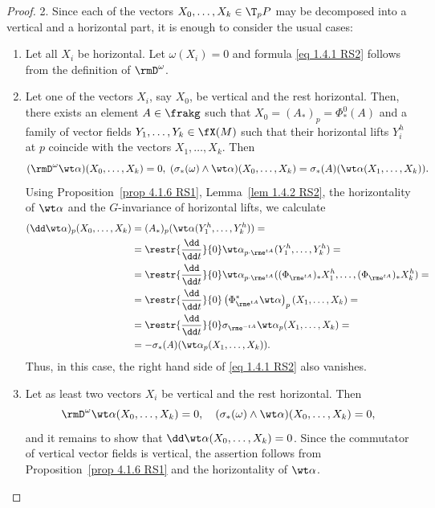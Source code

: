 \begin{proof}
    2. Since each of the vectors $X_0,\ldots,X_k\in \T_pP$ may be decomposed into a vertical and a horizontal part, it is enough to consider the usual cases:
    \begin{enumerate}[label=(\alph*)]
        \item Let all $X_i$ be horizontal. Let $\omega(X_i)=0$ and formula \eqref{eq 1.4.1 RS2} follows from the definition of $\rmD^\omega$.
        \item Let one of the vectors $X_i$, say $X_0$, be vertical and the rest horizontal. Then, there exists an element $A\in\frakg$ such that $X_0=(A_\ast)_p=\Phi^0_\ast(A)$ and a family of vector fields $Y_1,\ldots,Y_k\in\fX(M)$ such that their horizontal lifts $Y_i^h$ at $p$ coincide with the vectors $X_1,\ldots,X_k$. Then
        \[(\rmD^\omega\wt\alpha)(X_0,\ldots,X_k)=0,\; (\sigma_\ast(\omega)\wedge\wt\alpha)(X_0,\ldots,X_k)=\sigma_\ast(A)(\wt\alpha(X_1,\ldots,X_k)).\]
        Using Proposition~\ref{prop 4.1.6 RS1}, Lemma~\ref{lem 1.4.2 RS2}, the horizontality of $\wt\alpha$ and the $G$-invariance of horizontal lifts, we calculate
        \begin{align}
            (\dd\wt\alpha)_p(X_0,\ldots,X_k)&=(A_\ast)_p(\wt\alpha(Y_1^h,\ldots,Y_k^h))=\notag\\
            &=\restr{\frac{\dd}{\dd t}}{0}\wt\alpha_{p\cdot \rme^{tA}}(Y_1^h,\ldots,Y_k^h)=\notag\\
            &=\restr{\frac{\dd}{\dd t}}{0}\wt\alpha_{p\cdot \rme^{tA}}((\Phi_{\rme^{tA}})_\ast X_1^h,\ldots,(\Phi_{\rme^{tA}})_\ast X_k^h)=\notag\\
            &=\restr{\frac{\dd}{\dd t}}{0}\left(\Phi_{\rme^{tA}}^\ast\wt\alpha\right)_p(X_1,\ldots,X_k)=\notag\\
            &=\restr{\frac{\dd}{\dd t}}{0}\sigma_{\rme^{-tA}}\wt\alpha_p(X_1,\ldots,X_k)=\notag\\
            &=-\sigma_\ast(A)(\wt\alpha_p(X_1,\ldots,X_k)).
        \end{align}
        Thus, in this case, the right hand side of \eqref{eq 1.4.1 RS2} also vanishes.
        \item Let as least two vectors $X_i$ be vertical and the rest horizontal. Then
        \[\rmD^\omega\wt\alpha(X_0,\ldots,X_k)=0,\quad (\sigma_\ast(\omega)\wedge \wt\alpha)(X_0,\ldots,X_k)=0,\]
        and it remains to show that $\dd\wt\alpha(X_0,\ldots,X_k)=0$. Since the commutator of vertical vector fields is vertical, the assertion follows from Proposition~\ref{prop 4.1.6 RS1} and the horizontality of $\wt\alpha$.
    \end{enumerate}
\end{proof}


